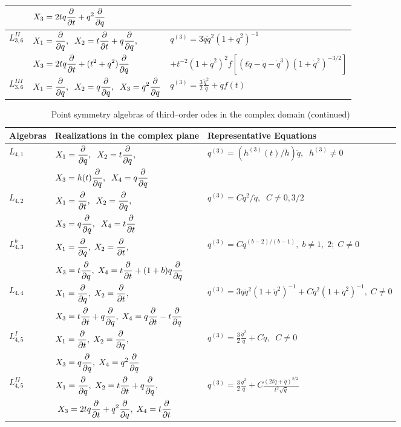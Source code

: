 \begin{table}
\begin{center}
\begin{tabular}{|l|l|l|}
& $X_3=2tq\dt+q^2\dq$ &  \\
\hline
$L_{3,6}^{II}$ & $ X_1=\dq,\;\;X_2=t\dt+q\dq,$ &
$ q^{(3)}=3\dot q\ddot q^2 (1+\dot q^2)^{-1}$\\
& $X_3=2tq\dt+(t^2+q^2)\dq$  & $+t^{-2}(1+\dot q^2)^2
f[(t\ddot q-\dot q-\dot q^3)(1+\dot q^2)^{-3/2}]$ \\
\hline
$L_{3,6}^{III}$ & $ X_1=\dq,\;\;X_2=q\dq,\;\;X_3=q^2\dq$ &
$q^{(3)}=\displaystyle{\frac{3}{2}\frac{\ddot q^2}{\dot q}}+\dot qf(t)$ \\
\hline
\end{tabular}
\end{center}
\end{table}

\setcounter{table}{0}
\begin{table}
\label{ch2:tab2}
\begin{center}
\caption{Point symmetry algebras of third--order odes in the complex domain
(continued)}
\begin{tabular}{|l|l|l|}
\hline
Algebras  & Realizations in the complex plane & Representative Equations \\
\hline \hline
$L_{4,1}$ & $X_1=\dq,\;\;X_2=t\dq,$ &
$q^{(3)}= \left ( h^{(3)}(t)/\ddot h \right )\ddot q,\;\; h^{(3)}\ne 0$\\
& $X_3=h(t)\dq,\;\;X_4=q\dq$ &  \\
\hline
$L_{4,2}$ & $X_1=\dt,\;\;X_2=\dq,$ &
$q^{(3)}=C\ddot q^2/\dot q,\;\;C\ne 0,3/2$\\
& $X_3=q\dq,\;\;X_4=t\dt$ & \\
\hline
$L_{4,3}^b$ & $X_1=\dq,\;X_2=\dt,$ &
$ q^{(3)}=C\ddot q^{(b-2)/(b-1)},\;b\ne 1,\;2;\;C\ne 0$ \\
& $X_3=t\dq,\;X_4=t\dt+(1+b)q\dq$ & \\
\hline
$L_{4,4}$ & $X_1=\dq,\;X_2=\dt,$ &
$q^{(3)}=3\dot q\ddot q^2(1+\dot q^2)^{-1}+C\ddot q^2 (1+\dot q^2)^{-1},\;
C\ne 0 $\\
& $X_3=t\dt+q\dq,\;X_4=q\dt-t\dq$ & \\
\hline
$L_{4,5}^I$ & $X_1=\dt,\;X_2=\dq,$ &
$ q^{(3)}=\displaystyle{\frac{3}{2}\frac{\ddot q^2}{\dot q}}
+C\dot q,\;\; C\ne 0$\\
& $X_3=q\dq,\;X_4=q^2\dq$   &   \\
\hline
$L_{4,5}^{II}$ & $X_1=\dq,\;X_2=t\dt+q\dq,$ &
$ q^{(3)}=\displaystyle{\frac{3}{2}\frac{\ddot q^2}{\dot q}
+C\frac{(2t\ddot q+\dot q)^{3/2}}
{t^2\sqrt{\dot q}}}$\\
& $\;X_3=2tq\dt+q^2\dq,\;X_4=t\dt$ & \\

\end{tabular}
\end{center}
\end{table}
